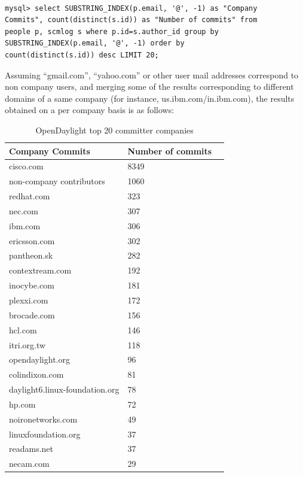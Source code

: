 \documentclass[a4paper, 12pt]{book}
\begin{document}
\begin{verbatim}

mysql> select SUBSTRING_INDEX(p.email, '@', -1) as "Company
Commits", count(distinct(s.id)) as "Number of commits" from
people p, scmlog s where p.id=s.author_id group by
SUBSTRING_INDEX(p.email, '@', -1) order by
count(distinct(s.id)) desc LIMIT 20;

\end{verbatim}
Assuming ``gmail.com'', ``yahoo.com'' or other user mail addresses correspond to non company users, and merging some of the results corresponding to different domains of a same company (for instance, us.ibm.com/in.ibm.com), the results obtained on a per company basis is as follows:

\begin{table}[H]
\footnotesize
\begin{center}
\begin{tabular}{|l|l|p{3cm}|}
\hline
\textbf{Company Commits} & \textbf{Number of commits} \\ \hline
cisco.com & 8349 \\ \hline
non-company contributors & 1060 \\ \hline
redhat.com & 323 \\ \hline
nec.com & 307 \\ \hline
ibm.com & 306 \\ \hline
ericsson.com & 302 \\ \hline
pantheon.sk & 282 \\ \hline
contextream.com & 192 \\ \hline
inocybe.com & 181 \\ \hline
plexxi.com & 172 \\ \hline
brocade.com & 156 \\ \hline
hcl.com & 146 \\ \hline
itri.org.tw & 118 \\ \hline
opendaylight.org & 96 \\ \hline
colindixon.com & 81 \\ \hline
daylight6.linux-foundation.org & 78 \\ \hline
hp.com & 72 \\ \hline
noironetworks.com & 49 \\ \hline
linuxfoundation.org & 37 \\ \hline
readams.net & 37 \\ \hline
necam.com & 29 \\ \hline
\end{tabular}
\end{center}
\caption{OpenDaylight top 20 committer companies}
\label{tab:odl_top_companies}
\end{table}
\end{document}
